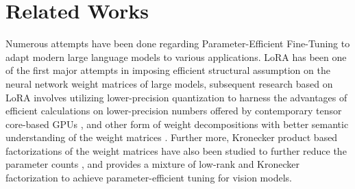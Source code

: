 \section{Related Works}
Numerous attempts have been done regarding Parameter-Efficient Fine-Tuning to adapt modern large language models to various applications. LoRA \cite{lora} has been one of the first major attempts in imposing efficient structural assumption on the neural network weight matrices of large models, subsequent research based on LoRA involves utilizing lower-precision quantization to harness the advantages of efficient calculations on lower-precision numbers offered by contemporary tensor core-based GPUs \cite{qlora}, and other form of weight decompositions with better semantic understanding of the weight matrices \cite{dora}. Further more, Kronecker product based factorizations of the weight matrices have also been studied to further reduce the parameter counts \cite{krona, kadaptation}, and \citeauthor{kadaptation} provides a mixture of low-rank and Kronecker factorization to achieve parameter-efficient tuning for vision models.